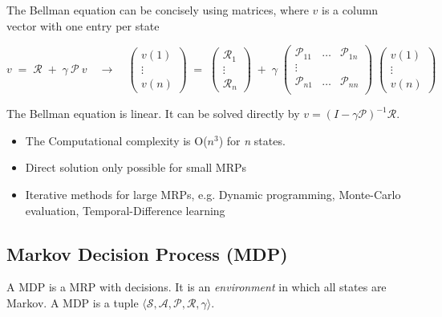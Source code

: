 \documentclass[10pt]{article}
\begin{document}
The Bellman  equation can be concisely using matrices, where $v$ is a column vector with one entry per state

\begin{equation}
v \; = \; \mathcal{R} \; + \; \gamma \: \mathcal{P} \: v \quad \rightarrow \quad
\begin{pmatrix}
v(1) \\ \vdots \\ v(n) \end{pmatrix} \; = \; \begin{pmatrix}
\mathcal{R}_{1} \\ \vdots \\ \mathcal{R}_{n} \end{pmatrix} \; + \; \gamma \; \begin{pmatrix}
\mathcal{P}_{11} & \ldots & \mathcal{P}_{1n} \\
\vdots & & \\
\mathcal{P}_{n1} & \ldots & \mathcal{P}_{nn} \\ \end{pmatrix} \; \begin{pmatrix}
v(1) \\ \vdots \\ v(n) \end{pmatrix}
\end{equation}

The Bellman equation is linear. It can be solved directly by $v = (I - \gamma \mathcal{P})^{-1} \mathcal{R}$.

\begin{itemize}
\item The Computational complexity is O($n^{3}$) for \textit{n} states.
\item Direct solution only possible for small MRPs
\item Iterative methods for large MRPs, e.g. Dynamic programming, Monte-Carlo evaluation, Temporal-Difference learning
\end{itemize}

\subsection{Markov Decision Process (MDP)}
A MDP is a MRP with decisions. It is an \textit{environment} in which all states are Markov. \newline
A MDP is a tuple $\langle \mathcal{S, A, P, R,} \gamma \rangle$.
\end{document}
